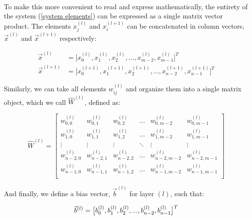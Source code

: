 \documentclass[12pt,letterpaper]{article}
\begin{document}
\paragraph*{}To make this more convenient to read and express mathematically, the entirety of the system (\ref{system elements}) can be expressed as a single matrix vector product. The elements $x^{(l)}_j$ and $x^{(l+1)}_i$ can be concatenated in column vectors, $\vec{x}^{(l)}$ and  $\vec{x}^{(l+1)}$ respectively:

\begin{equation}
\label{2 layers}
\begin{split}
\vec{x}^{(l)} 	&= \big[ x^{(l)}_0 , x^{(l)}_1 , x^{(l)}_2 , ... , x^{(l)}_{m-2} , x^{(l)}_{m-1} \big]^T \\
\vec{x}^{(l+1)} &= \big[ x^{(l+1)}_0 , x^{(l+1)}_1 , x^{(l+1)}_2 , ... , x^{(l+1)}_{n-2} , x^{(l+1)}_{n-1} \big]^T 
\end{split}
\end{equation}

Similarly, we can take all elements $w^{(l)}_{ij}$ and organize them into a single matrix object, which we call $\hat{W}^{(l)}$, defined as:

\begin{equation}
\label{weights}
\hat{W}^{(l)} = 
\begin{bmatrix}
w^{(l)}_{0,0} & w^{(l)}_{0,1} & w^{(l)}_{0,2} & \hdots & w^{(l)}_{0,m-2} & w^{(l)}_{0,m-1} \\
w^{(l)}_{1,0} & w^{(l)}_{1,1} & w^{(l)}_{1,2} & \hdots & w^{(l)}_{1,m-2} & w^{(l)}_{1,m-1} \\
\vdots & \vdots & \vdots & \ddots & \vdots & \vdots \\
w^{(l)}_{n-2,0} & w^{(l)}_{n-2,1} & w^{(l)}_{n-2,2} & \hdots & w^{(l)}_{n-2,m-2} & w^{(l)}_{n-2,m-1} \\
w^{(l)}_{n-1,0} & w^{(l)}_{n-1,1} & w^{(l)}_{n-1,2} & \hdots & w^{(l)}_{n-1,m-2} & w^{(l)}_{n-1,m-1} \\
\end{bmatrix}
\end{equation}

And finally, we define a bias vector, $\vec{b}^{(l)}$ for layer $(l)$, such that:

\begin{equation}
\label{bias}
\vec{b}^{(l)} = \big[ b^{(l)}_0 , b^{(l)}_1 , b^{(l)}_2 , ... , b^{(l)}_{n-2} , b^{(l)}_{n-1} \big]^T \\
\end{equation}
\end{document}
